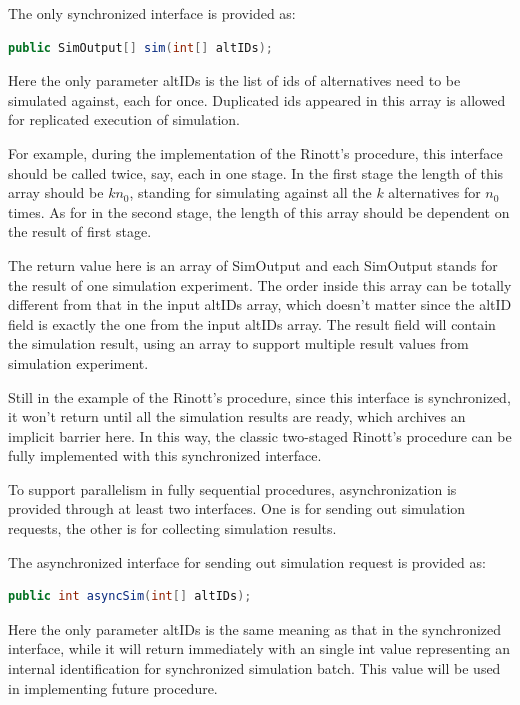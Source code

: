 \documentclass[12pt,a4paper]{report}
\begin{document}
The only synchronized interface is provided as:

\begin{lstlisting}[language=Java]
public SimOutput[] sim(int[] altIDs);
\end{lstlisting}

Here the only parameter altIDs is the list of ids of alternatives need to be simulated against, each for once. Duplicated ids appeared in this array is allowed for replicated execution of simulation.

For example, during the implementation of the Rinott's procedure, this interface should be called twice, say, each in one stage. In the first stage the length of this array should be $kn_0$, standing for simulating against all the $k$ alternatives for $n_0$ times. As for in the second stage, the length of this array should be dependent on the result of first stage.

The return value here is an array of SimOutput and each SimOutput stands for the result of one simulation experiment. The order inside this array can be totally different from that in the input altIDs array, which doesn't matter since the altID field is exactly the one from the input altIDs array. The result field will contain the simulation result, using an array to support multiple result values from simulation experiment.

Still in the example of the Rinott's procedure, since this interface is synchronized, it won't return until all the simulation results are ready, which archives an implicit barrier here. In this way, the classic two-staged Rinott's procedure can be fully implemented with this synchronized interface.

To support parallelism in fully sequential procedures, asynchronization is provided through at least two interfaces. One is for sending out simulation requests, the other is for collecting simulation results.

The asynchronized interface for sending out simulation request is provided as:

\begin{lstlisting}[language=Java]
public int asyncSim(int[] altIDs);
\end{lstlisting}

Here the only parameter altIDs is the same meaning as that in the synchronized interface, while it will return immediately with an single int value representing an internal identification for synchronized simulation batch. This value will be used in implementing future procedure.
\end{document}
